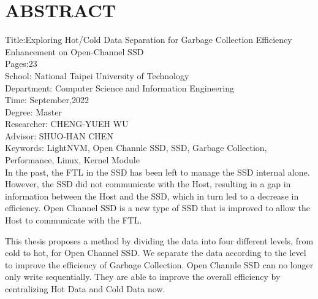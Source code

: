 \chapter*{ABSTRACT}


\noindent
Title:Exploring Hot/Cold Data Separation for Garbage Collection Efficiency Enhancement on Open-Channel SSD\\
Pages:23\\
School: National Taipei University of Technology\\
Department: Computer Science and Information Engineering\\
Time: September,2022\\
Degree: Master\\
Researcher: CHENG-YUEH WU\\
Advisor: SHUO-HAN CHEN\\
Keywords: LightNVM, Open Channle SSD, SSD, Garbage Collection, Performance, Linux, Kernel Module\\
\indent
In the past, the FTL in the SSD has been left to manage the SSD internal alone. However, the SSD did not communicate with the Host, resulting in a gap in information between the Host and the SSD, which in turn led to a decrease in efficiency. Open Channel SSD is a new type of SSD that is improved to allow the Host to communicate with the FTL.

\indent
This thesis proposes a method by dividing the data into four different levels, from cold to hot, for Open Channel SSD. We separate the data according to the level to improve the efficiency of Garbage Collection. Open Channle SSD can no longer only write sequentially. They are able to improve the overall efficiency by centralizing Hot Data and Cold Data now.


